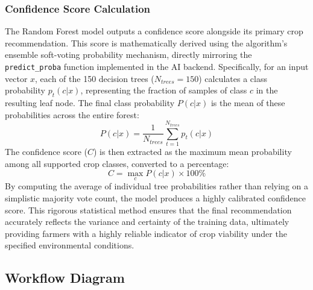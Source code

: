 \subsubsection{Confidence Score Calculation}
The Random Forest model outputs a confidence score alongside its primary crop recommendation. This score is mathematically derived using the algorithm's ensemble soft-voting probability mechanism, directly mirroring the \texttt{predict\_proba} function implemented in the AI backend. Specifically, for an input vector $x$, each of the 150 decision trees ($N_{trees} = 150$) calculates a class probability $p_t(c|x)$, representing the fraction of samples of class $c$ in the resulting leaf node. The final class probability $P(c|x)$ is the mean of these probabilities across the entire forest:
\begin{equation}
P(c|x) = \frac{1}{N_{trees}} \sum_{t=1}^{N_{trees}} p_t(c|x)
\end{equation}
The confidence score ($C$) is then extracted as the maximum mean probability among all supported crop classes, converted to a percentage:
\begin{equation}
C = \max_c P(c|x) \times 100\%
\end{equation}
By computing the average of individual tree probabilities rather than relying on a simplistic majority vote count, the model produces a highly calibrated confidence score. This rigorous statistical method ensures that the final recommendation accurately reflects the variance and certainty of the training data, ultimately providing farmers with a highly reliable indicator of crop viability under the specified environmental conditions.

\subsection{Workflow Diagram}
\label{sec:workflow}


